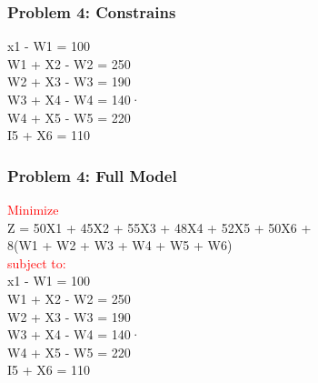 \documentclass[10pt,svgnames,fragile]{beamer}
\begin{document}
\begin{frame}[label={sec:orge9abdcb}]{}
\frametitle{Problem 4: Constrains }

x1 - W1 = 100\\ 

W1 + X2 - W2 = 250\\

W2 + X3  - W3 = 190\\

W3 + X4 - W4 = 140·\\

W4 + X5 - W5 = 220\\

I5 + X6 = 110\\




\end{frame}

\begin{frame}[label={sec:orge9abdcb}]{}
\frametitle{Problem 4: Full Model }
\textcolor{red}{Minimize}\\[1em]

Z = 50X1 + 45X2 + 55X3 + 48X4 + 52X5 + 50X6 +\\ 8(W1 + W2 + W3 + W4 + W5 + W6)\\[1em]
\textcolor{red}{subject to:}\\[1em]
x1 - W1 = 100\\ 

W1 + X2 - W2 = 250\\

W2 + X3  - W3 = 190\\

W3 + X4 - W4 = 140·\\

W4 + X5 - W5 = 220\\

I5 + X6 = 110\\

\end{frame}
\end{document}
